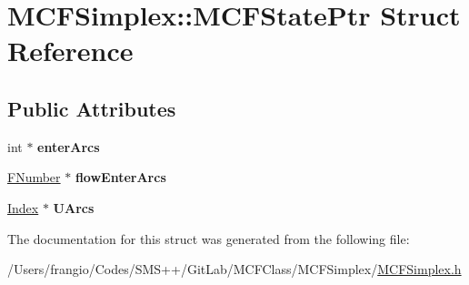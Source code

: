 \hypertarget{struct_m_c_f_simplex_1_1_m_c_f_state_ptr}{}\section{M\+C\+F\+Simplex\+:\+:M\+C\+F\+State\+Ptr Struct Reference}
\label{struct_m_c_f_simplex_1_1_m_c_f_state_ptr}
\subsection*{Public Attributes}
\begin{DoxyCompactItemize}
\item 
\mbox{\label{struct_m_c_f_simplex_1_1_m_c_f_state_ptr_aa6c301895e13d12a4e11cb116a720a59}} 
int $\ast$ {\bfseries enter\+Arcs}
\item 
\mbox{\label{struct_m_c_f_simplex_1_1_m_c_f_state_ptr_a57d48ccc26571228af4c2ab54938bda4}} 
\mbox{\hyperlink{class_m_c_f_class_aeea3e5951d222b2a8e57de1b4246a909}{F\+Number}} $\ast$ {\bfseries flow\+Enter\+Arcs}
\item 
\mbox{\label{struct_m_c_f_simplex_1_1_m_c_f_state_ptr_ae2d0e33ac04e09b7cd77b4af573b6b07}} 
\mbox{\hyperlink{class_m_c_f_class_ad53d6229d7ec28555a9c9c2fd9abf773}{Index}} $\ast$ {\bfseries U\+Arcs}
\end{DoxyCompactItemize}


The documentation for this struct was generated from the following file\+:\begin{DoxyCompactItemize}
\item 
/\+Users/frangio/\+Codes/\+S\+M\+S++/\+Git\+Lab/\+M\+C\+F\+Class/\+M\+C\+F\+Simplex/\mbox{\hyperlink{_m_c_f_simplex_8h}{M\+C\+F\+Simplex.\+h}}\end{DoxyCompactItemize}
